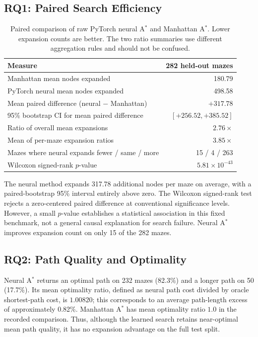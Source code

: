 \subsection{RQ1: Paired Search Efficiency}
\label{sec:d3-paired}
\begin{table}[H]
\centering
\small
\begin{tabular}{lr}
\toprule
\textbf{Measure} & \textbf{282 held-out mazes} \\
\midrule
Manhattan mean nodes expanded & 180.79 \\
PyTorch neural mean nodes expanded & 498.58 \\
Mean paired difference (neural $-$ Manhattan) & $+317.78$ \\
95\% bootstrap CI for mean paired difference & $[+256.52,+385.52]$ \\
Ratio of overall mean expansions & $2.76\times$ \\
Mean of per-maze expansion ratios & $3.85\times$ \\
Mazes where neural expands fewer / same / more & 15 / 4 / 263 \\
Wilcoxon signed-rank $p$-value & $5.81\times10^{-43}$ \\
\bottomrule
\end{tabular}
\caption{Paired comparison of raw PyTorch neural A$^\ast$ and Manhattan A$^\ast$.
Lower expansion counts are better. The two ratio summaries use different
aggregation rules and should not be confused.}
\label{tab:d3-paired}
\end{table}

The neural method expands 317.78 additional nodes per maze on average, with a
paired-bootstrap 95\% interval entirely above zero. The Wilcoxon signed-rank
test rejects a zero-centered paired difference at conventional significance
levels. However, a small $p$-value establishes a statistical association in
this fixed benchmark, not a general causal explanation for search failure.
Neural A$^\ast$ improves expansion count on only 15 of the 282 mazes.

\subsection{RQ2: Path Quality and Optimality}
\label{sec:d3-optimality}
Neural A$^\ast$ returns an optimal path on 232 mazes (82.3\%) and a longer
path on 50 (17.7\%). Its mean optimality ratio, defined as neural path cost
divided by oracle shortest-path cost, is $1.00820$; this corresponds to an
average path-length excess of approximately 0.82\%. Manhattan A$^\ast$ has
mean optimality ratio $1.0$ in the recorded comparison. Thus, although the
learned search retains near-optimal mean path quality, it has no expansion
advantage on the full test split.

